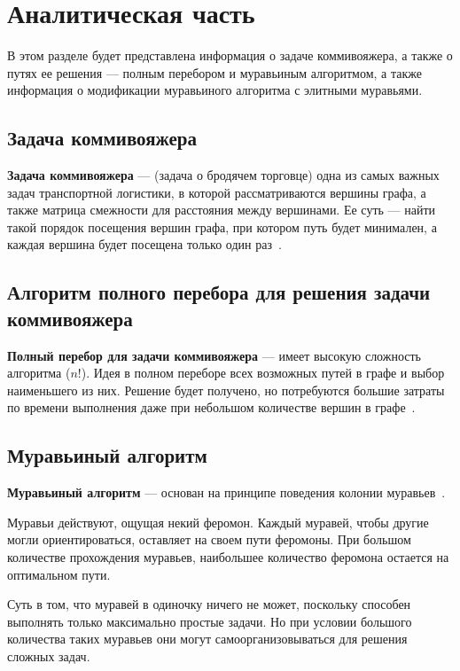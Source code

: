 \chapter{Аналитическая часть}
В этом разделе будет представлена информация о задаче коммивояжера, а также о путях ее решения --- полным перебором и муравьиным алгоритмом, а также информация о модификации муравьиного алгоритма с элитными муравьями.

\section{Задача коммивояжера}

\textbf{Задача коммивояжера} --- (задача о бродячем торговце) одна из самых важных задач транспортной логистики, в которой рассматриваются вершины графа, а также матрица смежности для расстояния между вершинами. Ее суть --- найти такой порядок посещения вершин графа, при котором путь будет минимален, а каждая вершина будет посещена только один раз~\cite{kom-task}.

\section{Алгоритм полного перебора для решения задачи коммивояжера}

\textbf{Полный перебор для задачи коммивояжера} --- имеет высокую сложность алгоритма ($n!$). Идея в полном переборе всех возможных путей в графе и выбор наименьшего из них. Решение будет получено, но потребуются большие затраты по времени выполнения даже при небольшом количестве вершин в графе~\cite{kom-task-all}.


\section{Муравьиный алгоритм}

\textbf{Муравьиный алгоритм} --- основан на принципе поведения колонии муравьев~\cite{ant-alg}.

Муравьи действуют, ощущая некий феромон. Каждый муравей, чтобы другие могли ориентироваться, оставляет на своем пути феромоны. При большом количестве прохождения муравьев, наибольшее количество феромона остается на оптимальном пути.

Суть в том, что муравей в одиночку ничего не может, поскольку способен выполнять только максимально простые задачи. Но при условии большого количества таких муравьев они могут самоорганизовываться для решения сложных задач.

